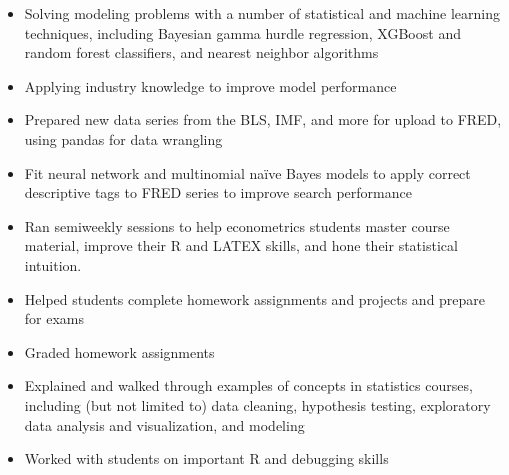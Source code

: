 \documentclass[10pt,a4paper,ragged2e,withhyper]{altacv}
\begin{document}
	\begin{paracol}{2}
		
		\begin{itemize}
			\item Solving modeling problems with a number of statistical and machine learning techniques, including Bayesian gamma hurdle regression, XGBoost and random forest classifiers, and nearest neighbor algorithms
			\item Applying industry knowledge to improve model performance
		\end{itemize}
		
		\divider
		
		\begin{itemize}
			\item Prepared new data series from the BLS, IMF, and more for upload to FRED, using pandas for data wrangling
			\item Fit neural network and multinomial naïve Bayes models to apply correct descriptive tags to FRED series to improve search performance
		\end{itemize}
		
		\divider
		
		\begin{itemize}
			\item Ran semiweekly sessions to help econometrics students master course material, improve their R and LATEX skills, and hone their statistical intuition.
			\item Helped students complete homework assignments and projects and prepare for exams
			\item Graded homework assignments
		\end{itemize}
		
		\divider
		
		\begin{itemize}
		\item Explained and walked through examples of concepts in statistics courses, including (but not limited to) data cleaning, hypothesis testing, exploratory data analysis and visualization, and modeling
		\item Worked with students on important R and debugging skills
		\end{itemize}
		

\end{paracol}
\end{document}
